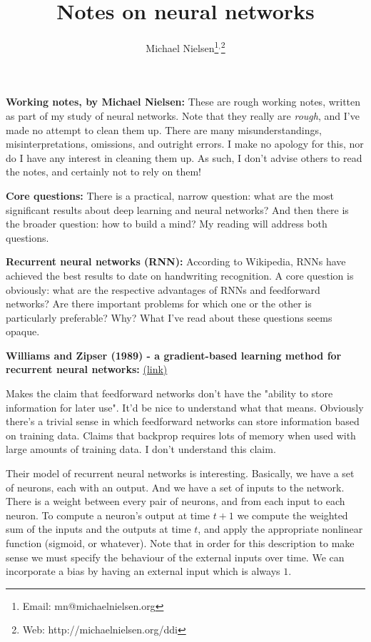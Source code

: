 \documentclass[12pt]{article}
\newcommand{\link}[2]{\href{#1}{#2}}
\begin{document}
\title{Notes on neural networks}
\author{Michael Nielsen\thanks{Email: mn@michaelnielsen.org}$^{,}$\thanks{Web: http://michaelnielsen.org/ddi}}

\maketitle

\textbf{Working notes, by Michael Nielsen:} These are rough working
notes, written as part of my study of neural networks.  Note that they
really are \emph{rough}, and I've made no attempt to clean them up.
There are many misunderstandings, misinterpretations, omissions, and
outright errors.  I make no apology for this, nor do I have any
interest in cleaning them up.  As such, I don't advise others to read
the notes, and certainly not to rely on them!

\textbf{Core questions:} There is a practical, narrow question: what
are the most significant results about deep learning and neural
networks?  And then there is the broader question: how to build a
mind?  My reading will address both questions.

\textbf{Recurrent neural networks (RNN):} According to Wikipedia, RNNs
have achieved the best results to date on handwriting recognition.  A
core question is obviously: what are the respective advantages of RNNs
and feedforward networks?  Are there important problems for which one
or the other is particularly preferable?  Why?  What I've read about
these questions seems opaque.

\textbf{Williams and Zipser (1989) - a gradient-based learning method
  for recurrent neural networks:}
\link{http://scholar.google.ca/scholar?cluster=1352799553544912946\&hl=en\&as\_sdt=0,5}{(link)}
  
  Makes the claim that feedforward networks don't have the "ability to
  store information for later use".  It'd be nice to understand what
  that means.  Obviously there's a trivial sense in which feedforward
  networks can store information based on training data.  Claims that
  backprop requires lots of memory when used with large amounts of
  training data.  I don't understand this claim.
  
  Their model of recurrent neural networks is interesting.  Basically,
  we have a set of neurons, each with an output.  And we have a set of
  inputs to the network.  There is a weight between every pair of
  neurons, and from each input to each neuron.  To compute a neuron's
  output at time $t+1$ we compute the weighted sum of the inputs and
  the outputs at time $t$, and apply the appropriate nonlinear
  function (sigmoid, or whatever).  Note that in order for this
  description to make sense we must specify the behaviour of the
  external inputs over time.  We can incorporate a bias by having an
  external input which is always $1$.
  
\end{document}

